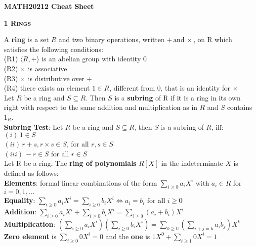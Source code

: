 \documentclass[a4paper]{article}
\begin{document}

\begin{center}
	\huge{\textbf{MATH20212 Cheat Sheet}}\\
\end{center}

\begin{framed}
	\begin{center}
		\textbf{\textsc{1 Rings}}
	\end{center}
	A \textbf{ring} is a set $R$ and two binary operations, written $+ \, \text{and} \, \times$, on R which satisfies the following conditions:\\
	(R1) $\langle R, + \rangle$ is an abelian group with identity 0\\
	(R2) $\times$ is associative\\
	(R3) $\times$ is distributive over $+$\\
	(R4) there exists an element $1 \in R$, different from 0, that is an identity for $\times$\\
	
	\noindent
	Let $R$ be a ring and $S \subseteq R$. Then $S$ is a \textbf{subring} of R if it is a ring in its own right with respect to the same addition and multiplication as in $R$ and $S$ contains $1_R$.\\
	
	\noindent
	\textbf{Subring Test}: Let $R$ be a ring and $S \subseteq R$, then $S$ is a subring of $R$, iff:\\
	$(i) \, 1 \in S$\\
	$(ii) \, r + s, r \times s \in S$, for all $r, s \in S$\\
	$(iii) \, -r \in S$ for all $r \in S$\\
	
	\noindent
	Let R be a ring. The \textbf{ring of polynomials} $R[X]$ in the indeterminate $X$ is defined as follows:\\
	\textbf{Elements}: formal linear combinations of the form $\sum_{i \geq 0}a_iX^i$ with $a_i \in R$ for $i = 0, 1, \dots$\\
	\textbf{Equality}: $\sum_{i \geq 0}a_iX^i = \sum_{i \geq 0}b_iX^i \iff a_i = b_i$ for all $i \geq 0$\\
	\textbf{Addition}: $\sum_{i \geq 0}a_iX^i + \sum_{i \geq 0}b_iX^i = \sum_{i \geq 0}(a_i + b_i)X^i$\\
	\textbf{Multiplication}: $(\sum_{i \geq 0}a_iX^i)(\sum_{i \geq 0}b_iX^i) = \sum_{k \geq 0}(\sum_{i + j = k}a_ib_j)X^k$\\
	\textbf{Zero element} is $\sum_{i \geq 0}0X^i = 0$ and the \textbf{one} is $1X^0 + \sum_{i \geq 1}0X^i = 1$\\
	

\end{framed}
\end{document}
